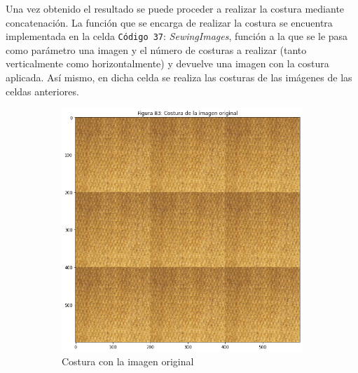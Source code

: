 \documentclass[11pt,twoside,titlepage,a4paper]{article}
\numberwithin{equation}{section} %
\theoremstyle{usual}
\begin{document}
Una vez obtenido el resultado se puede proceder a realizar la costura mediante concatenación. La función que se encarga de realizar la costura se encuentra implementada en la celda \texttt{Código 37}: \textit{SewingImages}, función a la que se le pasa como parámetro una imagen y el número de costuras a realizar (tanto verticalmente como horizontalmente) y devuelve una imagen con la costura aplicada. Así mismo, en dicha celda se realiza las costuras de las imágenes de las celdas anteriores.

\begin{figure}[h]
    \centering
    \begin{subfigure}[t]{.3\textwidth}
        \centering
        \includegraphics[width=\textwidth]{imagenes/PoissonImageEditing_cell_91_output_0.png}
        \caption{Costura con la imagen original}
        \label{fig:costuraConcatOriginal}
    \end{subfigure}
    \centering
    \begin{subfigure}[t]{.3\textwidth}
        \centering

\end{subfigure}
\end{figure}
\end{document}
